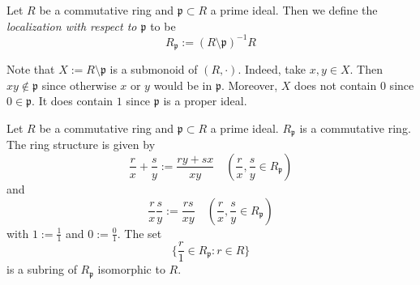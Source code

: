 \begin{definition}
    Let $R$ be a commutative ring and $\mathfrak{p}\subset R$ a prime ideal. Then we define the \emph{localization with respect to $\mathfrak{p}$} to be 
    $$
        R_\mathfrak{p} := (R\setminus \mathfrak{p})^{-1}R
    $$
\end{definition}
\begin{remark}
    Note that $X:=R\setminus \mathfrak{p}$ is a submonoid of $(R,\cdot)$. Indeed, take $x,y\in X$. Then $xy\notin \mathfrak{p}$ since otherwise $x$ or $y$ would be in $\mathfrak{p}$. Moreover, $X$ does not contain $0$ since $0\in \mathfrak{p}$. It does contain $1$ since $\mathfrak{p}$ is a proper ideal. 
\end{remark}
\begin{lemma}
    Let $R$ be a commutative ring and $\mathfrak{p}\subset R$ a prime ideal. $R_\mathfrak{p}$ is a commutative ring. The ring structure is given by 
    $$
        \frac{r}{x}+\frac{s}{y} := \frac{ry+sx}{xy} \quad \left(\frac{r}{x},\frac{s}{y} \in R_\mathfrak{p}\right)$$
    and 
    $$
        \frac{r}{x}\frac{s}{y} := \frac{rs}{xy} \quad \left(\frac{r}{x},\frac{s}{y} \in R_\mathfrak{p}\right)
    $$
    with $1 := \frac{1}{1}$ and $ 0 := \frac{0}{1}$. The set 
    $$
        \{ \frac{r}{1}\in R_\mathfrak{p}: r\in R\}
    $$
    is a subring of $R_\mathfrak{p}$ isomorphic to $R$. 
\end{lemma}
